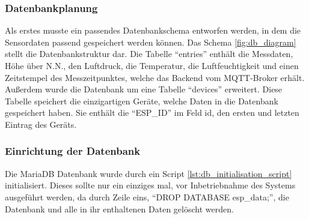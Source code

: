 \subsubsection{Datenbankplanung}
Als erstes musste ein passendes Datenbankschema entworfen werden, in dem die Sensordaten passend gespeichert werden können. Das Schema \ref{fig:db_diagram} stellt die Datenbankstruktur dar.
Die Tabelle "`entries"' enthält die Messdaten, Höhe über N.N., den Luftdruck, die Temperatur, die Luftfeuchtigkeit und einen Zeitstempel des Messzeitpunktes, welche das Backend vom MQTT-Broker erhält. Außerdem wurde die Datenbank um eine Tabelle "`devices"' erweitert. Diese Tabelle speichert die einzigartigen Geräte, welche Daten in die Datenbank gespeichert haben. Sie enthält die "`ESP\_ID"' im Feld id, den ersten und letzten Eintrag des Geräts.

\subsubsection{Einrichtung der Datenbank}
Die MariaDB Datenbank wurde durch ein Script \ref{lst:db_initialisation_script} initialisiert.  Dieses sollte nur ein einziges mal, vor Inbetriebnahme des Systems ausgeführt werden, da durch Zeile eins, "`DROP DATABASE esp\_data;"', die Datenbank und alle in ihr enthaltenen Daten gelöscht werden. 
